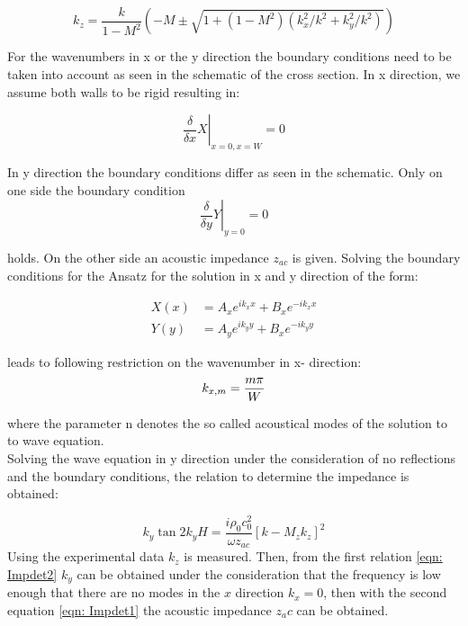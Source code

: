 \documentclass[11pt]{report} %
\begin{document}
\begin{equation}\label{eqn: Impdet2}
    k_z = \frac{k}{1-M^2} \left( -M \pm \sqrt{1+(1-M^2)(k_x^2/k^2 + k_y^2/k^2)}\right)    
\end{equation}

For the wavenumbers in x or the y direction the boundary conditions need to be taken into account as seen in the schematic of the cross section.
In x direction, we assume both walls to be rigid resulting in:
 
\begin{equation}
\left.\frac{\delta}{\delta x}X\right\rvert_{x=0,x=W}=0
\end{equation}

In y direction the boundary conditions differ as seen in the schematic. 
Only on one side the boundary condition 
\begin{equation}
\left.\frac{\delta}{\delta y}Y\right\rvert_{y=0}=0
\end{equation}

holds.
On the other side an acoustic impedance $z_{ac}$ is given. 
Solving the boundary conditions for the Ansatz for the solution in x and y direction of the form: 

\begin{subequations}
\begin{align}
X(x)&=A_xe^{ik_xx}+B_xe^{-ik_xx}\\
Y(y)&=A_ye^{ik_yy}+B_xe^{-ik_yy}
\end{align}
\end{subequations}
 
leads to following restriction on the wavenumber in x- direction: 
\begin{equation}
k_{x,m}=\frac{m\pi}{W}\\
\end{equation}

where the parameter n denotes the so called acoustical modes of the solution to to wave equation.\\
Solving the wave equation in y direction under the consideration of no reflections and the boundary conditions, the relation to determine the impedance is obtained: 

\begin{equation}\label{eqn: Impdet1}
    k_y \tan 2k_y H = \frac{i \rho_0 c_0^2}{\omega z_{ac}} \left[k-M_zk_z\right]^2
\end{equation}
Using the experimental data $k_z$ is measured. 
Then, from the first relation \ref{eqn: Impdet2} $k_y$ can be obtained under the consideration that the frequency is low enough that there are no modes in the $x$ direction $k_x = 0$, then with the second equation \ref{eqn: Impdet1} the acoustic impedance $z_ac$ can be obtained.
\end{document}
